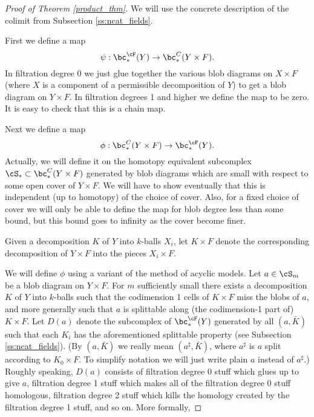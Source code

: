 \begin{proof}[Proof of Theorem \ref{product_thm}]
We will use the concrete description of the colimit from Subsection \ref{ss:ncat_fields}.

First we define a map 
\[
	\psi: \bc_*^\cF(Y) \to \bc_*^C(Y\times F) .
\]
In filtration degree 0 we just glue together the various blob diagrams on $X\times F$
(where $X$ is a component of a permissible decomposition of $Y$) to get a blob diagram on
$Y\times F$.
In filtration degrees 1 and higher we define the map to be zero.
It is easy to check that this is a chain map.

Next we define a map 
\[
	\phi: \bc_*^C(Y\times F) \to \bc_*^\cF(Y) .
\]
Actually, we will define it on the homotopy equivalent subcomplex
$\cS_* \sub \bc_*^C(Y\times F)$ generated by blob diagrams which are small with 
respect to some open cover
of $Y\times F$.
We will have to show eventually that this is independent (up to homotopy) of the choice of cover.
Also, for a fixed choice of cover we will only be able to define the map for blob degree less than
some bound, but this bound goes to infinity as the cover become finer.

Given a decomposition $K$ of $Y$ into $k$-balls $X_i$, let $K\times F$ denote the corresponding
decomposition of $Y\times F$ into the pieces $X_i\times F$.


We will define $\phi$ using a variant of the method of acyclic models.
Let $a\in \cS_m$ be a blob diagram on $Y\times F$.
For $m$ sufficiently small there exists a decomposition $K$ of $Y$ into $k$-balls such that the
codimension 1 cells of $K\times F$ miss the blobs of $a$, and more generally such that $a$ is splittable along (the codimension-1 part of) $K\times F$.
Let $D(a)$ denote the subcomplex of $\bc_*^\cF(Y)$ generated by all $(a, \bar{K})$
such that each $K_i$ has the aforementioned splittable property
(see Subsection \ref{ss:ncat_fields}).
(By $(a, \bar{K})$ we really mean $(a^\sharp, \bar{K})$, where $a^\sharp$ is 
$a$ split according to $K_0\times F$.
To simplify notation we will just write plain $a$ instead of $a^\sharp$.)
Roughly speaking, $D(a)$ consists of filtration degree 0 stuff which glues up to give
$a$, filtration degree 1 stuff which makes all of the filtration degree 0 stuff homologous, 
filtration degree 2 stuff which kills the homology created by the 
filtration degree 1 stuff, and so on.
More formally,
 

\end{proof}
